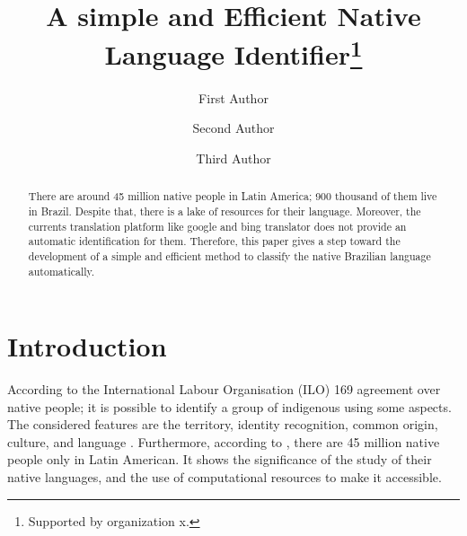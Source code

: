 \documentclass[runningheads]{llncs}
\begin{document}
%
    \title{A simple and Efficient Native Language Identifier\thanks{Supported by organization x.}}
%
%
    \author{First Author \and
        Second Author \and
        Third Author}
%
%
%
    \maketitle              %
%
    \begin{abstract}
        There are around 45 million native people in Latin America; 900 thousand of them live in Brazil. Despite that, there is a lake of resources for their language. Moreover, the currents translation platform like google and bing translator does not provide an automatic identification for them. Therefore, this paper gives a step toward the development of a simple and efficient method to classify the native Brazilian language automatically.
    \end{abstract}

%
%
%

    \section{Introduction}\label{sec:introduction}
    According to the International Labour Organisation (ILO) 169 agreement over native people; it is possible to identify a group of indigenous using some aspects.
    The considered features are the territory, identity recognition, common origin, culture, and language \cite{povos_indigenas}.
    Furthermore, according to \cite{povos_indigenas}, there are 45 million native people only in Latin American.
    It shows the significance of the study of their native languages, and the use of computational resources to make it accessible.
\end{document}
